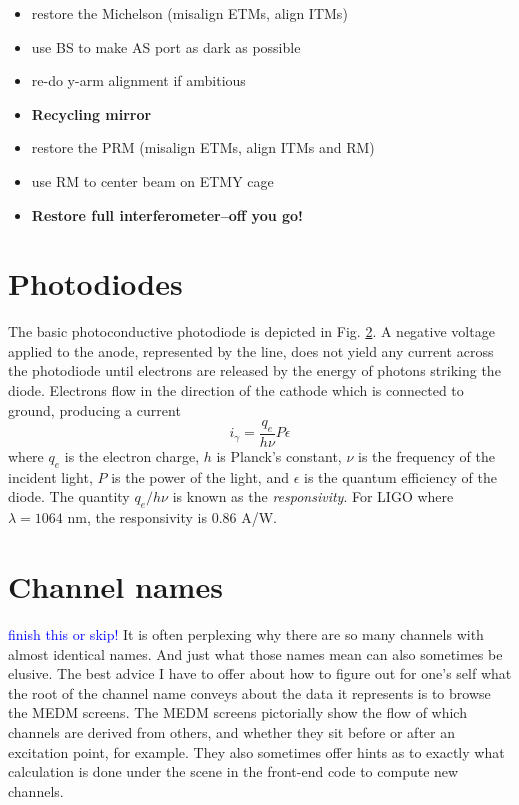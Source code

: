 \begin{itemize}
\item restore the Michelson (misalign ETMs, align ITMs) \vspace{-10pt}
\item use BS to make AS port as dark as possible \vspace{-10pt}
\item re-do y-arm alignment if ambitious 
\item[] \textbf{Recycling mirror} \vspace{-10pt}
\item restore the PRM (misalign ETMs, align ITMs and RM)
  \vspace{-10pt}
\item use RM to center beam on ETMY cage 
\item[] \textbf{Restore full interferometer--off you go!}
\end{itemize}





\section{Photodiodes}
\label{sec:pds}
The basic photoconductive photodiode is depicted in Fig. \ref{}. A
negative voltage applied to the anode, represented by the line, does
not yield any current across the photodiode until electrons are
released by the energy of photons striking the diode. Electrons flow
in the direction of the cathode which is connected to ground,
producing a current
\begin{equation}
i_\gamma = \frac{q_e}{h \nu} P \epsilon
\end{equation}
where $q_e$ is the electron charge, $h$ is Planck's constant, $\nu$ is
the frequency of the incident light, $P$ is the power of the light,
and $\epsilon$ is the quantum efficiency of the diode. The quantity
$q_e/h \nu$ is known as the \emph{responsivity}. For LIGO where
$\lambda = 1064$ nm, the responsivity is $0.86$ A/W.



\section{Channel names}
\textcolor{blue}{finish this or skip!}
It is often perplexing why there are so many channels with almost
identical names. And just what those names mean can also sometimes be
elusive. The best advice I have to offer about how to figure out for
one's self what the root of the channel name conveys about the data it
represents is to browse the MEDM screens. The MEDM screens pictorially
show the flow of which channels are derived from others, and whether
they sit before or after an excitation point, for example. They also
sometimes offer hints as to exactly what calculation is done under the
scene in the front-end code to compute new channels. 

